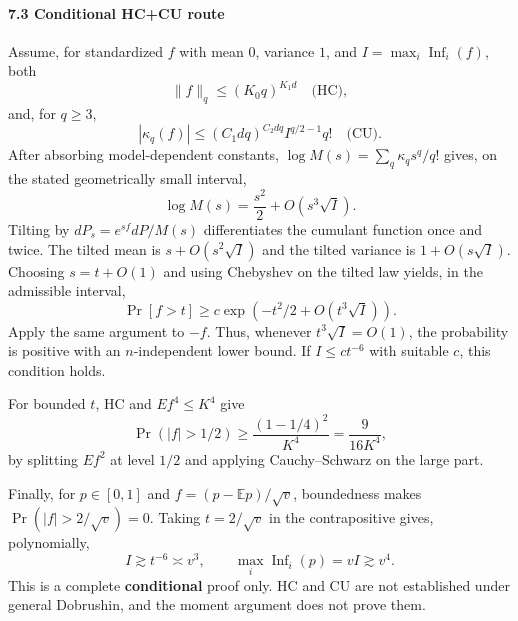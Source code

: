 \paragraph{7.3 Conditional HC+CU route}\label{conditional-hccu-route}

Assume, for standardized \(f\) with mean \(0\), variance \(1\), and \(I=\max_i\operatorname{Inf}_i(f)\), both
\[\|f\|_q\le(K_0q)^{K_1d}\quad\text{(HC)},\]
and, for \(q\ge3\),
\[|\kappa_q(f)|\le(C_1dq)^{C_2dq}I^{q/2-1}q!\quad\text{(CU)}.\]
After absorbing model-dependent constants, \(\log M(s)=\sum_q\kappa_qs^q/q!\) gives, on the stated geometrically small interval,
\[\log M(s)=\frac{s^2}{2}+O(s^3\sqrt I).\]
Tilting by \(dP_s=e^{sf}dP/M(s)\) differentiates the cumulant function once and twice. The tilted mean is \(s+O(s^2\sqrt I)\) and the tilted variance is \(1+O(s\sqrt I)\). Choosing \(s=t+O(1)\) and using Chebyshev on the tilted law yields, in the admissible interval,
\[\Pr[f>t]\ge c\exp(-t^2/2+O(t^3\sqrt I)).\]
Apply the same argument to \(-f\). Thus, whenever \(t^3\sqrt I=O(1)\), the probability is positive with an \(n\)-independent lower bound. If \(I\le c t^{-6}\) with suitable \(c\), this condition holds.

For bounded \(t\), HC and \(Ef^4\le K^4\) give
\[\Pr(|f|>1/2)\ge\frac{(1-1/4)^2}{K^4}=\frac9{16K^4},\]
by splitting \(Ef^2\) at level \(1/2\) and applying Cauchy--Schwarz on the large part.

Finally, for \(p\in[0,1]\) and \(f=(p-\mathbb Ep)/\sqrt v\), boundedness makes \(\Pr(|f|>2/\sqrt v)=0\). Taking \(t=2/\sqrt v\) in the contrapositive gives, polynomially,
\[I\gtrsim t^{-6}\asymp v^3,
\qquad \max_i\operatorname{Inf}_i(p)=vI\gtrsim v^4.\]
This is a complete \textbf{conditional} proof only. HC and CU are not established under general Dobrushin, and the moment argument does not prove them.
